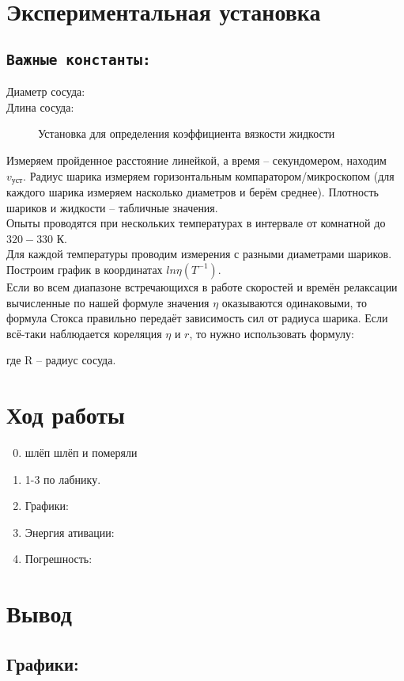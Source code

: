 \documentclass[11pt,a4paper]{article}
\begin{document}
\newpage

\section*{Экспериментальная установка}
\subsection*{\texttt{Важные константы:}}
  \indent Диаметр сосуда:\\
  \indent Длина сосуда:\\

\begin{figure}[h!]
  \caption{Установка для определения коэффициента
  вязкости жидкости}
  \label{fig:ust}
\end{figure}

Измеряем пройденное расстояние линейкой, а время -- секундомером,
находим $v_\text{уст}$. Радиус шарика измеряем горизонтальным
компаратором/микроскопом (для каждого шарика измеряем насколько диаметров и берём среднее).
Плотность шариков и жидкости -- табличные значения.\\
Опыты проводятся при нескольких температурах в интервале от
комнатной до $320-330$ К.\\
Для каждой температуры проводим измерения с разными диаметрами шариков.\\
Построим график в координатах $ln\eta (T^{-1})$.\\
Если во всем диапазоне встречающихся в работе 
скоростей и времён релаксации вычисленные по нашей формуле
значения $\eta$ оказываются одинаковыми, то формула Стокса правильно
передаёт зависимость сил от радиуса шарика.
Если всё-таки наблюдается кореляция $\eta$ и $r$, то нужно использовать формулу:
\begin{center}{
  }\end{center}
где R --  радиус сосуда.
  
\section*{Ход работы}
\begin{enumerate}
  \setcounter{enumi}{-1}
  \item шлёп шлёп и померяли
  \item 1-3 по лабнику.
  \item Графики:
  \item Энергия ативации:
  \item Погрешность:
\end{enumerate}

\section*{Вывод}
  \subsection*{\textbf{Графики:}}
  \begin{figure}[h]
    \label{fig:graph1}
  \end{figure}
  \newpage
  \begin{figure}[h]
    \label{fig:graph2}
  \end{figure}
\end{document}
